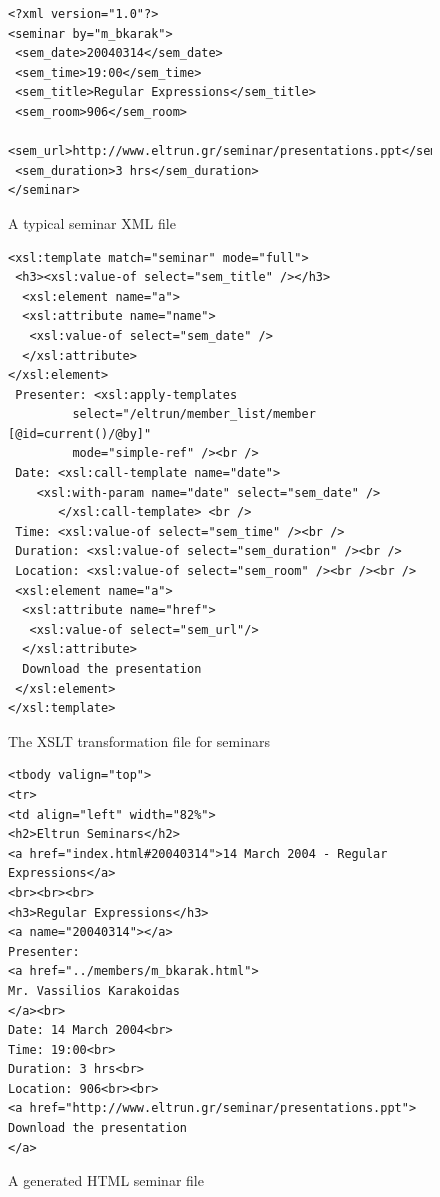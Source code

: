 \documentclass[10pt]{article}
\begin{document}
\begin{figure}
\lstset{language=MYLANG,basicstyle=\ttfamily}
{\begin{lstlisting}
<?xml version="1.0"?>
<seminar by="m_bkarak">
 <sem_date>20040314</sem_date>
 <sem_time>19:00</sem_time>
 <sem_title>Regular Expressions</sem_title>
 <sem_room>906</sem_room>
 <sem_url>http://www.eltrun.gr/seminar/presentations.ppt</sem_url>
 <sem_duration>3 hrs</sem_duration>
</seminar>
\end{lstlisting}}
\caption{A typical seminar XML file}
\label{fig:project-xml}
\end{figure}

\begin{figure}
\lstset{language=MYLANG,basicstyle=\ttfamily}
{\begin{lstlisting}
<xsl:template match="seminar" mode="full">
 <h3><xsl:value-of select="sem_title" /></h3>
  <xsl:element name="a">
  <xsl:attribute name="name">
   <xsl:value-of select="sem_date" />
  </xsl:attribute>
</xsl:element>
 Presenter: <xsl:apply-templates 
 	     select="/eltrun/member_list/member [@id=current()/@by]" 
	     mode="simple-ref" /><br />
 Date: <xsl:call-template name="date">
	<xsl:with-param name="date" select="sem_date" />
       </xsl:call-template> <br />
 Time: <xsl:value-of select="sem_time" /><br />
 Duration: <xsl:value-of select="sem_duration" /><br />
 Location: <xsl:value-of select="sem_room" /><br /><br />
 <xsl:element name="a">
  <xsl:attribute name="href">
   <xsl:value-of select="sem_url"/>
  </xsl:attribute>
  Download the presentation
 </xsl:element>
</xsl:template>
\end{lstlisting}}
\caption{The XSLT transformation file for seminars}
\label{fig:project-xslt}
\end{figure}

\begin{figure}
\lstset{language=MYLANG,basicstyle=\ttfamily}
{\begin{lstlisting}
<tbody valign="top">
<tr>
<td align="left" width="82%">
<h2>Eltrun Seminars</h2>
<a href="index.html#20040314">14 March 2004 - Regular Expressions</a>
<br><br><br>
<h3>Regular Expressions</h3>
<a name="20040314"></a>
Presenter: 
<a href="../members/m_bkarak.html">
Mr. Vassilios Karakoidas
</a><br>
Date: 14 March 2004<br>
Time: 19:00<br>
Duration: 3 hrs<br>
Location: 906<br><br>
<a href="http://www.eltrun.gr/seminar/presentations.ppt">
Download the presentation
</a>
\end{lstlisting}}
\caption{A generated HTML seminar file}
\label{fig:project-html}
\end{figure}
\end{document}
